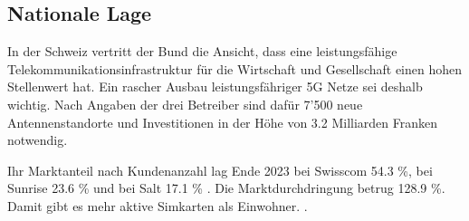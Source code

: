 \subsection{Nationale Lage}
In der Schweiz vertritt der Bund die Ansicht, dass eine leistungsfähige Telekommunikationsinfrastruktur für die Wirtschaft und Gesellschaft einen hohen Stellenwert hat. Ein rascher Ausbau leistungsfähriger 5G Netze sei deshalb wichtig. Nach Angaben der drei Betreiber sind dafür 7'500 neue Antennenstandorte und Investitionen in der Höhe von 3.2 Milliarden Franken notwendig. \cite{bundesratNachhaltigesMobilfunknetzBericht2022}

Ihr Marktanteil nach Kundenanzahl lag Ende 2023 bei Swisscom 54.3 \%, bei Sunrise 23.6 \% und bei Salt 17.1 \% \cite{bakomMarktanteileMobilfunknetz}. Die Marktdurchdringung betrug 128.9 \%. Damit gibt es mehr aktive Simkarten als Einwohner. \cite{bakomAnzahlMobilfunkkundinnenUnd}.

